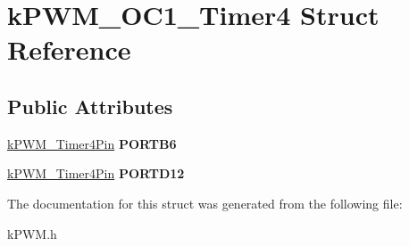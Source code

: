 \hypertarget{structkPWM__OC1__Timer4}{}\section{k\+P\+W\+M\+\_\+\+O\+C1\+\_\+\+Timer4 Struct Reference}
\label{structkPWM__OC1__Timer4}
\subsection*{Public Attributes}
\begin{DoxyCompactItemize}
\item 
\hyperlink{structkPWM__Timer4Pin}{k\+P\+W\+M\+\_\+\+Timer4\+Pin} {\bfseries P\+O\+R\+T\+B6}\hypertarget{structkPWM__OC1__Timer4_ab6964a95238638532b7fbe4775950ed8}{}\label{structkPWM__OC1__Timer4_ab6964a95238638532b7fbe4775950ed8}

\item 
\hyperlink{structkPWM__Timer4Pin}{k\+P\+W\+M\+\_\+\+Timer4\+Pin} {\bfseries P\+O\+R\+T\+D12}\hypertarget{structkPWM__OC1__Timer4_a57ccbd0b9ecedc0b838f80c4d45474d6}{}\label{structkPWM__OC1__Timer4_a57ccbd0b9ecedc0b838f80c4d45474d6}

\end{DoxyCompactItemize}


The documentation for this struct was generated from the following file\+:\begin{DoxyCompactItemize}
\item 
k\+P\+W\+M.\+h\end{DoxyCompactItemize}
